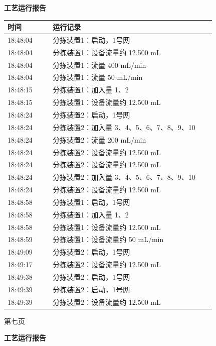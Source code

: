 \documentclass[UTF8,10pt,a4paper,fontset=fandol]{ctexart}
\begin{document}
\begin{center}
\begin{minipage}[t]{0.47\linewidth}
\centering
\textbf{工艺运行报告}

\scriptsize
\begin{tabular}{|p{0.20\linewidth}|p{0.72\linewidth}|}
\hline
时间 & 运行记录 \\ \hline
18:48:04 & 分拣装置1：启动，1号网 \\ \hline
18:48:04 & 分拣装置1：设备流量约 12.500 mL \\ \hline
18:48:04 & 分拣装置1：流量 400 mL/min \\ \hline
18:48:04 & 分拣装置1：流量 50 mL/min \\ \hline
18:48:15 & 分拣装置1：加入量 1、2 \\ \hline
18:48:15 & 分拣装置1：设备流量约 12.500 mL \\ \hline
18:48:24 & 分拣装置2：启动，1号网 \\ \hline
18:48:24 & 分拣装置2：加入量 3、4、5、6、7、8、9、10 \\ \hline
18:48:24 & 分拣装置2：流量 200 mL/min \\ \hline
18:48:24 & 分拣装置2：设备流量约 12.500 mL \\ \hline
18:48:24 & 分拣装置2：设备流量约 12.500 mL \\ \hline
18:48:24 & 分拣装置2：加入量 3、4、5、6、7、8、9、10 \\ \hline
18:48:24 & 分拣装置2：设备流量约 12.500 mL \\ \hline
18:48:58 & 分拣装置1：启动，1号网 \\ \hline
18:48:58 & 分拣装置1：加入量 1、2 \\ \hline
18:48:58 & 分拣装置1：设备流量约 12.500 mL \\ \hline
18:48:59 & 分拣装置1：设备流量约 50 mL/min \\ \hline
18:49:09 & 分拣装置2：启动，1号网 \\ \hline
18:49:17 & 分拣装置2：设备流量约 12.500 mL \\ \hline
18:49:38 & 分拣装置2：启动，1号网 \\ \hline
18:49:39 & 分拣装置2：启动，1号网 \\ \hline
18:49:39 & 分拣装置2：设备流量约 12.500 mL \\ \hline
\end{tabular}

\vspace{2mm}
第七页
\end{minipage}
\hfill
\begin{minipage}[t]{0.47\linewidth}
\centering
\textbf{工艺运行报告}


\end{minipage}
\end{center}
\end{document}
